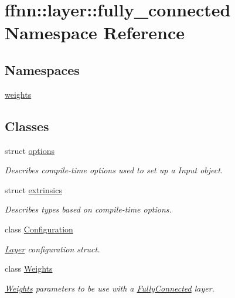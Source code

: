 \hypertarget{namespaceffnn_1_1layer_1_1fully__connected}{\section{ffnn\-:\-:layer\-:\-:fully\-\_\-connected Namespace Reference}
\label{namespaceffnn_1_1layer_1_1fully__connected}
}
\subsection*{Namespaces}
\begin{DoxyCompactItemize}
\item 
\hyperlink{namespaceffnn_1_1layer_1_1fully__connected_1_1weights}{weights}
\end{DoxyCompactItemize}
\subsection*{Classes}
\begin{DoxyCompactItemize}
\item 
struct \hyperlink{structffnn_1_1layer_1_1fully__connected_1_1options}{options}
\begin{DoxyCompactList}\small\item\em Describes compile-\/time options used to set up a Input object. \end{DoxyCompactList}\item 
struct \hyperlink{structffnn_1_1layer_1_1fully__connected_1_1extrinsics}{extrinsics}
\begin{DoxyCompactList}\small\item\em Describes types based on compile-\/time options. \end{DoxyCompactList}\item 
class \hyperlink{classffnn_1_1layer_1_1fully__connected_1_1_configuration}{Configuration}
\begin{DoxyCompactList}\small\item\em \hyperlink{classffnn_1_1layer_1_1_layer}{Layer} configuration struct. \end{DoxyCompactList}\item 
class \hyperlink{classffnn_1_1layer_1_1fully__connected_1_1_weights}{Weights}
\begin{DoxyCompactList}\small\item\em \hyperlink{classffnn_1_1layer_1_1fully__connected_1_1_weights}{Weights} parameters to be use with a \hyperlink{classffnn_1_1layer_1_1_fully_connected}{Fully\-Connected} layer. \end{DoxyCompactList}\end{DoxyCompactItemize}
